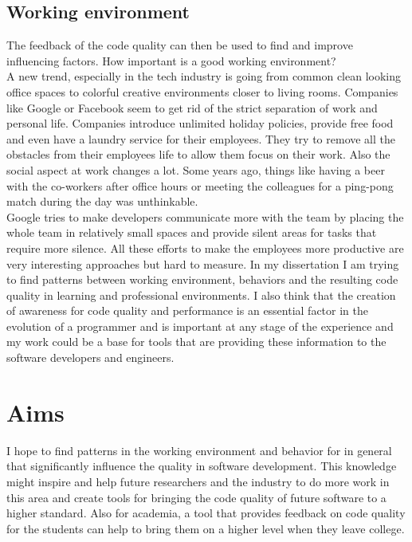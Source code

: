 \subsection{Working environment}
The feedback of the code quality can then be used to find and improve influencing factors. 
How important is a good working environment?\\
A new trend, especially in the tech industry is going from common clean looking office spaces to colorful creative environments closer to living rooms. Companies like Google or Facebook seem to get rid of the strict separation of work and personal life. Companies introduce unlimited holiday policies, provide free food and even have a laundry service for their employees. They try to remove all the obstacles from their employees life to allow them focus on their work. 
Also the social aspect at work changes a lot. Some years ago, things like having a beer with the co-workers after office hours or meeting the colleagues for a ping-pong match during the day was unthinkable.\\
Google tries to make developers communicate more with the team by placing the whole team in relatively small spaces and provide silent areas for tasks that require more silence. 
All these efforts to make the employees more productive are very interesting approaches but hard to measure. 
\bigbreak
In my dissertation I am trying to find patterns between working environment, behaviors and the resulting code quality in learning and professional environments. I also think that the creation of awareness for code quality and performance is an essential factor in the evolution of a programmer and is important at any stage of the experience and my work could be a base for tools that are providing these information to the software developers and engineers. 

\section{Aims}
I hope to find patterns in the working environment and behavior for in general that significantly influence the quality in software development.
This knowledge might inspire and help future researchers and the industry to do more work in this area and create tools for bringing the code quality of future software to a higher standard. 
Also for academia, a tool that provides feedback on code quality for the students can help to bring them on a higher level when they leave college. 

